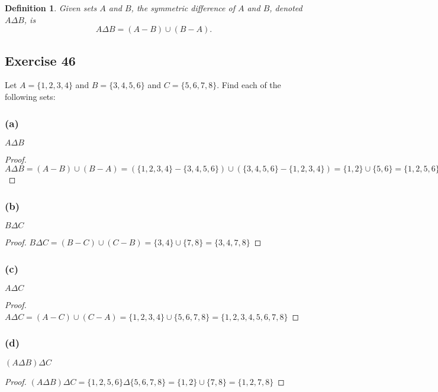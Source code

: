 \documentclass[14pt]{extarticle}
\newtheorem{defn}{Definition}
\begin{document}
\begin{tcolorbox}[colframe=cyan]
  \begin{defn}
    Given sets $A$ and $B$, the symmetric difference of $A$ and $B$, denoted \(A \Delta B\), is
    \[
      A \Delta B = (A - B) \cup (B - A).
    \]
  \end{defn}
\end{tcolorbox}

\subsection{Exercise 46}
Let \(A = \{1,2,3,4\}\) and \(B = \{3,4,5,6\}\) and \(C = \{5,6,7,8\}\). Find each of the following sets:

\subsubsection{(a)}
\(A \Delta B\)

\begin{proof}
  \(A \Delta B = (A - B) \cup (B - A) = (\{1,2,3,4\} - \{3,4,5,6\}) \cup (\{3,4,5,6\} - \{1,2,3,4\}) =
  \{1,2\} \cup \{5,6\} = \{1,2,5,6\}\)
\end{proof}

\subsubsection{(b)}
\(B \Delta C\)

\begin{proof}
  \(B \Delta C = (B - C) \cup (C - B) = \{3,4\} \cup \{7,8\} = \{3,4,7,8\}\)
\end{proof}

\subsubsection{(c)}
\(A \Delta C\)

\begin{proof}
  \(A \Delta C = (A - C) \cup (C - A) = \{1,2,3,4\} \cup \{5,6,7,8\} = \{1,2,3,4,5,6,7,8\}\)
\end{proof}

\subsubsection{(d)}
\((A \Delta B) \Delta C\)

\begin{proof}
  \((A \Delta B) \Delta C = \{1,2,5,6\} \Delta \{5,6,7,8\} = \{1,2\} \cup \{7,8\} = \{1,2,7,8\}\)
\end{proof}
\end{document}
